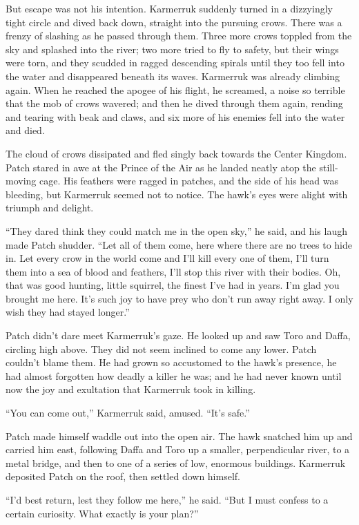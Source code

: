 \documentclass[12pt]{memoir}
\begin{document}
But escape was not his intention. Karmerruk suddenly turned in a
dizzyingly tight circle and dived back down, straight into the
pursuing crows. There was a frenzy of slashing as he passed through
them. Three more crows toppled from the sky and splashed into the
river; two more tried to fly to safety, but their wings were torn, and
they scudded in ragged descending spirals until they too fell into the
water and disappeared beneath its waves. Karmerruk was already
climbing again. When he reached the apogee of his flight, he screamed,
a noise so terrible that the mob of crows wavered; and then he dived
through them again, rending and tearing with beak and claws, and six
more of his enemies fell into the water and died.

The cloud of crows dissipated and fled singly back towards the Center
Kingdom. Patch stared in awe at the Prince of the Air as he landed
neatly atop the still-moving cage. His feathers were ragged in
patches, and the side of his head was bleeding, but Karmerruk seemed
not to notice. The hawk’s eyes were alight with triumph and delight.

“They dared think they could match me in the open sky,” he said, and
his laugh made Patch shudder. “Let all of them come, here where there
are no trees to hide in. Let every crow in the world come and I’ll
kill every one of them, I’ll turn them into a sea of blood and
feathers, I’ll stop this river with their bodies. Oh, that was good
hunting, little squirrel, the finest I’ve had in years. I’m glad you
brought me here. It’s such joy to have prey who don’t run away right
away. I only wish they had stayed longer.”

Patch didn’t dare meet Karmerruk’s gaze. He looked up and saw Toro and
Daffa, circling high above. They did not seem inclined to come any
lower. Patch couldn’t blame them. He had grown so accustomed to the
hawk’s presence, he had almost forgotten how deadly a killer he was;
and he had never known until now the joy and exultation that Karmerruk
took in killing.

“You can come out,” Karmerruk said, amused. “It’s safe.”

Patch made himself waddle out into the open air. The hawk snatched him
up and carried him east, following Daffa and Toro up a smaller,
perpendicular river, to a metal bridge, and then to one of a series of
low, enormous buildings. Karmerruk deposited Patch on the roof, then
settled down himself.

“I’d best return, lest they follow me here,” he said. “But I must
confess to a certain curiosity. What exactly is your plan?”
\end{document}
